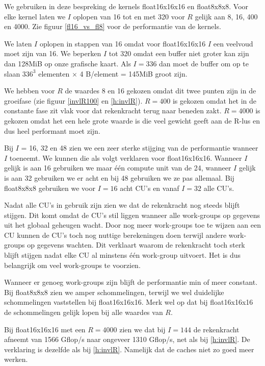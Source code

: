 We gebruiken in deze bespreking de kernels float16x16x16 en float8x8x8.
Voor elke kernel laten we $I$ oplopen van 16 tot en met 320 voor $R$ gelijk aan 8, 16, 400 en 4000. Zie figuur \ref{fl16_vs_fl8} voor de performantie van de kernels.

We laten $I$ oplopen in stappen van 16 omdat voor float16x16x16 $I$ een veelvoud moet zijn van 16. We beperken $I$ tot 320 omdat een buffer niet groter kan zijn dan 128MiB op onze grafische kaart. Als $I = 336$ dan moet de buffer om \TT{} op te slaan $336^3$ elementen $\times$ 4 B/element = 145MiB groot zijn.

We hebben voor $R$ de waardes 8 en 16 gekozen omdat dit twee punten zijn in de groeifase (zie figuur \ref{invlR100} en \ref{h:invlR}). $R=400$ is gekozen omdat het in de constante fase zit vlak voor dat rekenkracht terug naar beneden zakt. $R=4000$ is gekozen omdat het een hele grote waarde is die veel gewicht geeft aan de R-lus en dus heel performant moet zijn.

Bij $I$ = 16, 32 en 48 zien we een zeer sterke stijging van de performantie wanneer $I$ toeneemt. We kunnen die als volgt verklaren voor float16x16x16. Wanneer $I$ gelijk is aan 16 gebruiken we maar \'e\'en compute unit van de 24, wanneer $I$ gelijk is aan 32 gebruiken we er acht en bij 48 gebruiken we ze pas allemaal. Bij float8x8x8 gebruiken we voor $I=16$ acht CU's en vanaf $I=32$ alle CU's.

Nadat alle CU's in gebruik zijn zien we dat de rekenkracht nog steeds blijft stijgen. Dit komt omdat de CU's stil liggen wanneer alle work-groups op gegevens uit het globaal geheugen wacht. Door nog meer work-groups toe te wijzen aan een CU kunnen de CU's toch nog nuttige berekeningen doen terwijl andere work-groups op gegevens wachten. Dit verklaart waarom de rekenkracht toch sterk blijft stijgen nadat elke CU al minstens \'e\'en work-group uitvoert. Het is dus belangrijk om veel work-groups te voorzien.

Wanneer er genoeg work-groups zijn blijft de performantie min of meer constant. Bij float8x8x8 zien we amper schommelingen, terwijl we wel duidelijke schommelingen vaststellen bij float16x16x16. Merk wel op dat bij float16x16x16 de schommelingen gelijk lopen bij alle waardes van $R$.

Bij float16x16x16 met een $R=4000$ zien we dat bij $I=144$ de rekenkracht afneemt van 1566 Gflop/s naar ongeveer 1310 Gflop/s, net als bij \ref{h:invlR}. De verklaring is dezelfde als bij \ref{h:invlR}. Namelijk dat de caches niet zo goed meer werken.

